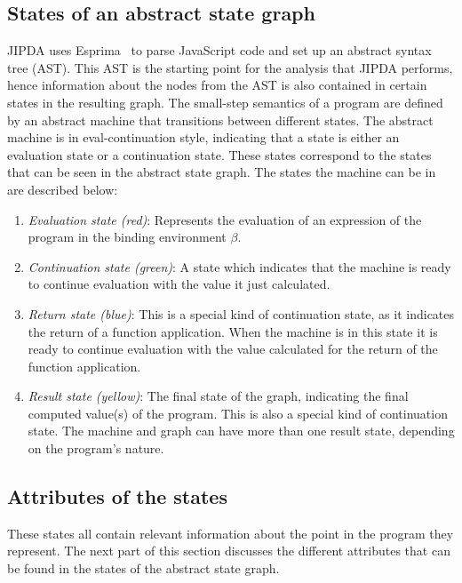 \subsection{States of an abstract state graph}

JIPDA uses Esprima~\cite{Esprima} to parse JavaScript code and set up an abstract syntax tree (AST). This AST is the starting point for the analysis that JIPDA performs, hence information about the nodes from the AST is also contained in certain states in the resulting graph. The small-step semantics of a program are defined by an abstract machine that transitions between different states. The abstract machine is in eval-continuation style, indicating that a state is either an evaluation state or a continuation state. These states correspond to the states that can be seen in the abstract state graph. The states the machine can be in are described below:

\begin{enumerate}
\item \textit{Evaluation state (red)}: Represents the evaluation of an expression of the program in the binding environment $\beta$.
\item \textit{Continuation state (green)}: A state which indicates that the machine is ready to continue evaluation with the value it just calculated.
\item \textit{Return state (blue)}: This is a special kind of continuation state, as it indicates the return of a function application. When the machine is in this state it is ready to continue evaluation with the value calculated for the return of the function application.
\item \textit{Result state (yellow)}: The final state of the graph, indicating the final computed value(s) of the program. This is also a special kind of continuation state. The machine and graph can have more than one result state, depending on the program's nature. 
\end{enumerate}



\subsection{Attributes of the states}
These states all contain relevant information about the point in the program they represent. The next part of this section discusses the different attributes that can be found in the states of the abstract state graph. 

